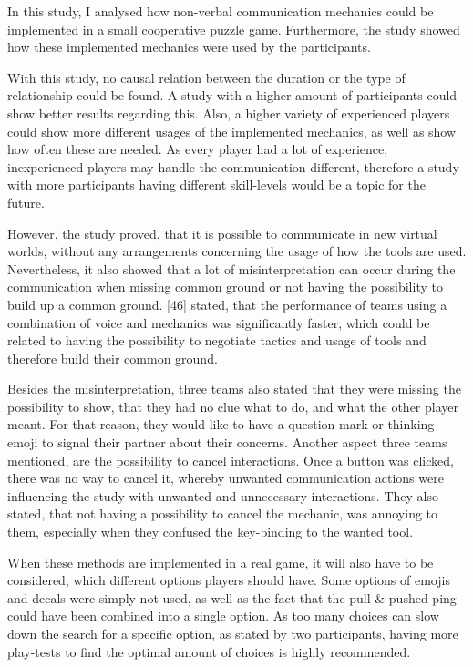 In this study, I analysed how non-verbal communication mechanics could be implemented in a small cooperative puzzle game. Furthermore, the study showed how these implemented mechanics were used by the participants.

With this study, no causal relation between the duration or the type of relationship could be found. 
A study with a higher amount of participants could show better results regarding this.
Also, a higher variety of experienced players could show more different usages of the implemented mechanics, as well as show how often these are needed. 
As every player had a lot of experience, inexperienced players may handle the communication different, therefore a study with more participants having different skill-levels would be a topic for the future.

However, the study proved, that it is possible to communicate in new virtual worlds, without any arrangements concerning the usage of how the tools are used. Nevertheless, it also showed that a lot of misinterpretation can occur during the communication when missing common ground or not having the possibility to build up a common ground.
\textcite{Vaddi2016Investigating2}[46] stated, that the performance of teams using a combination of voice and mechanics was significantly faster, which could be related to having the possibility to negotiate tactics and usage of tools and therefore build their common ground.

Besides the misinterpretation, three teams also stated that they were missing the possibility to show, that they had no clue what to do, and what the other player meant. For that reason, they would like to have a question mark or thinking-emoji to signal their partner about their concerns.
Another aspect three teams mentioned, are the possibility to cancel interactions. Once a button was clicked, there was no way to cancel it, whereby unwanted communication actions were influencing the study with unwanted and unnecessary interactions. They also stated, that not having a possibility to cancel the mechanic, was annoying to them, especially when they confused the key-binding to the wanted tool.

When these methods are implemented in a real game, it will also have to be considered, which different options players should have. Some options of emojis and decals were simply not used, as well as the fact that the pull \& pushed ping could have been combined into a single option. As too many choices can slow down the search for a specific option, as stated by two participants, having more play-tests to find the optimal amount of choices is highly recommended.